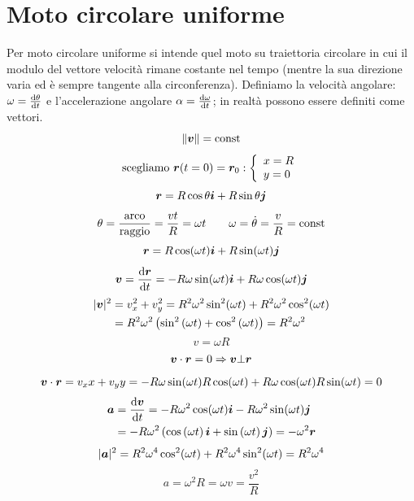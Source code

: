 \section{Moto circolare uniforme}
Per moto circolare uniforme si intende quel moto su traiettoria
circolare in cui il modulo del vettore velocità rimane costante
nel tempo (mentre la sua direzione varia ed è sempre tangente
alla circonferenza). Definiamo la velocità angolare: $\omega=\frac{\mathrm{d}\theta}{\mathrm{d} t}$ e l'accelerazione angolare $\alpha=\frac{\mathrm{d} \omega}{\mathrm{d} t}$; in realtà possono essere definiti come vettori.
\[\left\lVert\boldsymbol{v}\right\rVert=\text{const}\]
\[\text{scegliamo $\boldsymbol{r}(t=0)=\boldsymbol{r}_0$}:\left\{
  \begin{array}{l}
    x=R \\
    y=0 \\
  \end{array}\right.\]
\[\boldsymbol{r}=R\cos\theta\boldsymbol{i}+R\sin\theta\boldsymbol{j}\]
\[\theta=\frac{\text{arco}}{\text{raggio}}=\frac{vt}{R}=\omega t\qquad\omega=\dot\theta=\frac{v}{R}=\text{const}\]
\[\boldsymbol{r}=R\cos(\omega t)\boldsymbol{i}+R\sin(\omega t)\boldsymbol{j}\]
\[\boldsymbol{v}=\frac{\mathrm{d} \boldsymbol{r}}{\mathrm{d} t}=-R\omega\sin(\omega t)\boldsymbol{i}+R\omega\cos(\omega t)\boldsymbol{j}\]
\begin{align*}|\boldsymbol{v}|^2 & =v_x^2+v_y^2=R^2\omega^2\sin^2(\omega
              t)+R^2\omega^2\cos^2(\omega t)                                               \\
                        & =R^2\omega^2\left(\sin^2\left(\omega t\right)+\cos^2\left(\omega
              t\right)\right)=R^2\omega^2
\end{align*}
\[v=\omega R\]
\[\boldsymbol{v}\cdot\boldsymbol{r}=0\Rightarrow\boldsymbol{v}\bot\boldsymbol{r}\]
\[\boldsymbol{v}\cdot\boldsymbol{r}=v_xx+v_yy=-R\omega\sin(\omega t)R\cos(\omega t)+R\omega\cos(\omega t)R\sin(\omega t)=0\]
\begin{align*}
  \boldsymbol{a} & =\frac{\mathrm{d}\boldsymbol{v}}{\mathrm{d} t}=-R\omega^2\cos(\omega t)\boldsymbol{i}-R\omega^2\sin(\omega t)\boldsymbol{j}                              \\
        & =-R\omega^2\left(\cos\left(\omega t\right)\boldsymbol{i}+
  \sin\left(\omega t\right)\boldsymbol{j}\right)=-\omega^2\boldsymbol{r}
\end{align*}
\[|\boldsymbol{a}|^2=R^2\omega^4\cos^2(\omega t)+R^2\omega^4\sin^2(\omega
  t)=R^2\omega^4\]
\[a=\omega^2R=\omega v=\frac{v^2}{R}\]
